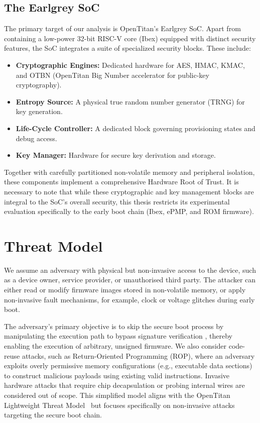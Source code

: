 \documentclass[10pt,a4paper,twocolumn,twoside]{article}
\begin{document}
\subsection{The Earlgrey SoC}
The primary target of our analysis is OpenTitan's Earlgrey SoC. Apart from containing a low-power 32-bit RISC-V core (Ibex) equipped with distinct security features, the SoC integrates a suite of specialized security blocks. These include:
\begin{itemize}
    \item \textbf{Cryptographic Engines:} Dedicated hardware for AES, HMAC, KMAC, and OTBN (OpenTitan Big Number accelerator for public-key cryptography).
    \item \textbf{Entropy Source:} A physical true random number generator (TRNG) for key generation.
    \item \textbf{Life-Cycle Controller:} A dedicated block governing provisioning states and debug access.
    \item \textbf{Key Manager:} Hardware for secure key derivation and storage.
\end{itemize}
Together with carefully partitioned non-volatile memory and peripheral isolation, these components implement a comprehensive Hardware Root of Trust. It is necessary to note that while these cryptographic and key management blocks are integral to the SoC's overall security, this thesis restricts its experimental evaluation specifically to the early boot chain (Ibex, ePMP, and ROM firmware).


\section{Threat Model}
We assume an adversary with physical but non-invasive access to the device, such as a device owner, service provider, or unauthorised third party. The attacker can either read or modify firmware images stored in non-volatile memory, or apply non-invasive fault mechanisms, for example, clock or voltage glitches during early boot. 

The adversary's primary objective is to skip the secure boot process by manipulating the execution path to bypass signature verification \cite{crypto}, thereby enabling the execution of arbitrary, unsigned firmware. We also consider code-reuse attacks, such as Return-Oriented Programming (ROP), where an adversary exploits overly permissive memory configurations (e.g., executable data sections) to construct malicious payloads using existing valid instructions. Invasive hardware attacks that require chip decapsulation or probing internal wires are considered out of scope. This simplified model aligns with the OpenTitan Lightweight Threat Model~\cite{threat} but focuses specifically on non-invasive attacks targeting the secure boot chain. 
\end{document}
